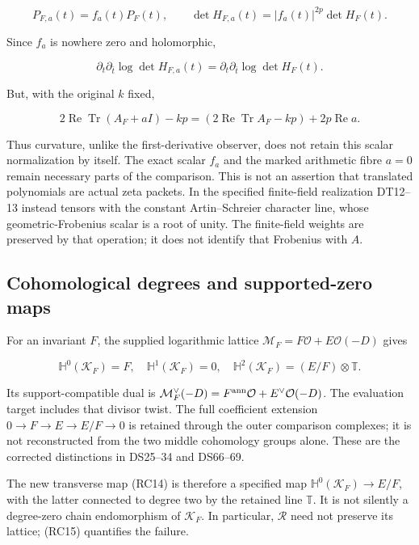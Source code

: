 \documentclass[
  11pt,
]{article}
\begin{document}
\[
P_{F,a}(t)=f_a(t)P_F(t),\qquad
\det H_{F,a}(t)=|f_a(t)|^{2p}\det H_F(t).
\tag{RC47}
\]

Since \(f_a\) is nowhere zero and holomorphic,

\[
\boxed{\partial_t\partial_{\bar t}\log\det H_{F,a}(t)
=\partial_t\partial_{\bar t}\log\det H_F(t).}
\tag{RC48}
\]

But, with the original \(k\) fixed,

\[
2\operatorname{Re}\operatorname{Tr}(A_F+aI)-kp
=(2\operatorname{Re}\operatorname{Tr}A_F-kp)+2p\operatorname{Re}a.
\tag{RC49}
\]

Thus curvature, unlike the first-derivative observer, does not retain
this scalar normalization by itself. The exact scalar \(f_a\) and the
marked arithmetic fibre \(a=0\) remain necessary parts of the
comparison. This is not an assertion that translated polynomials are
actual zeta packets. In the specified finite-field realization DT12--13
instead tensors with the constant Artin--Schreier character line, whose
geometric-Frobenius scalar is a root of unity. The finite-field weights
are preserved by that operation; it does not identify that Frobenius
with \(A\).

\subsection{Cohomological degrees and supported-zero
maps}\label{cohomological-degrees-and-supported-zero-maps}

For an invariant \(F\), the supplied logarithmic lattice
\(\mathcal M_F=F\mathcal O+E\mathcal O(-D)\) gives

\[
\mathbb H^0(\mathcal K_F)=F,\quad
\mathbb H^1(\mathcal K_F)=0,\quad
\mathbb H^2(\mathcal K_F)=(E/F)\otimes\mathbb T.
\tag{RC50}
\]

Its support-compatible dual is
\(\mathcal M_F^\vee(-D)=F^{\rm ann}\mathcal O+E^\vee\mathcal O(-D)\).
The evaluation target includes that divisor twist. The full coefficient
extension \(0\to F\to E\to E/F\to0\) is retained through the outer
comparison complexes; it is not reconstructed from the two middle
cohomology groups alone. These are the corrected distinctions in
DS25--34 and DS66--69.

The new transverse map (RC14) is therefore a specified map
\(\mathbb H^0(\mathcal K_F)\to E/F\), with the latter connected to
degree two by the retained line \(\mathbb T\). It is not silently a
degree-zero chain endomorphism of \(\mathcal K_F\). In particular,
\(\mathcal R\) need not preserve its lattice; (RC15) quantifies the
failure.
\end{document}
